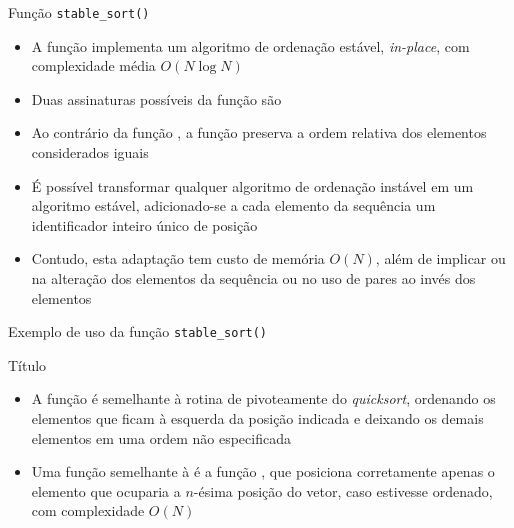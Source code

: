 \begin{frame}[fragile]{Função \texttt{stable\_sort()}}

    \begin{itemize}

        \item A função  implementa um algoritmo de ordenação estável,
            \textit{in-place}, com complexidade média $O(N\log N)$
        
        \item Duas assinaturas possíveis da função  são

        \item Ao contrário da função , a função 
            preserva a ordem relativa dos elementos considerados iguais

        \item É possível transformar qualquer algoritmo de ordenação instável em um algoritmo
            estável, adicionado-se a cada elemento da sequência um identificador inteiro 
            único de posição 

        \item Contudo, esta adaptação tem custo de memória $O(N)$, além de implicar ou na 
            alteração dos elementos da sequência ou no uso de pares ao invés dos elementos
    \end{itemize}

\end{frame}

\begin{frame}[fragile]{Exemplo de uso da função \texttt{stable\_sort()}}
\end{frame}

\begin{frame}[fragile]{Título}

    \begin{itemize}

        \item A função  é semelhante à rotina de pivoteamente do
            \textit{quicksort}, ordenando os elementos que ficam à esquerda da posição 
            indicada e deixando os demais elementos em uma ordem não especificada

        \item Uma função semelhante à  é a função 
            , que posiciona corretamente apenas o elemento que
            ocuparia a $n$-ésima posição do vetor, caso estivesse ordenado, com complexidade
            $O(N)$
    \end{itemize}

\end{frame}
